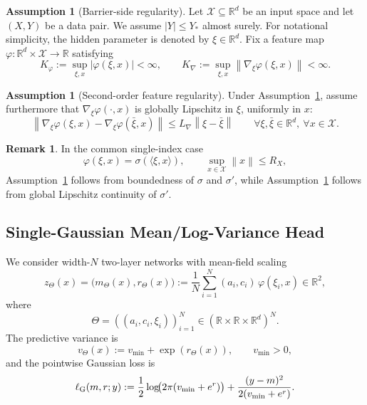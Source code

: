 \documentclass[11pt]{article}
\theoremstyle{definition}
\newtheorem{assumption}[theorem]{Assumption}
\newtheorem{remark}[theorem]{Remark}
\newcommand{\R}{\mathbb{R}}
\newcommand{\norm}[1]{\left\lVert #1 \right\rVert}
\newcommand{\abs}[1]{\left\lvert #1 \right\rvert}
\newcommand{\mc}[1]{\mathcal{#1}}
\begin{document}
\begin{assumption}[Barrier-side regularity]
\label{ass:barrier}
Let $\mc{X}\subseteq\R^d$ be an input space and let $(X,Y)$ be a data pair. We
assume $\abs{Y}\le Y_\ast$ almost surely. For notational simplicity, the hidden
parameter is denoted by $\xi\in\R^d$. Fix a feature map
$\varphi:\R^d\times\mc{X}\to\R$ satisfying
\[
  K_\varphi:=\sup_{\xi,x}\abs{\varphi(\xi,x)}<\infty,
  \qquad
  K_{\nabla}:=\sup_{\xi,x}\norm{\nabla_\xi \varphi(\xi,x)}<\infty.
\]
\end{assumption}

\begin{assumption}[Second-order feature regularity]
\label{ass:feature-second}
Under Assumption~\ref{ass:barrier}, assume furthermore that
$\nabla_\xi\varphi(\cdot,x)$ is globally Lipschitz in $\xi$, uniformly in $x$:
\[
  \norm{\nabla_\xi\varphi(\xi,x)-\nabla_\xi\varphi(\bar\xi,x)}
  \le
  L_{\nabla}\norm{\xi-\bar\xi}
  \qquad
  \forall \xi,\bar\xi\in\R^d,\ \forall x\in\mc{X}.
\]
\end{assumption}

\begin{remark}
In the common single-index case
\[
  \varphi(\xi,x)=\sigma(\langle \xi,x\rangle),
  \qquad
  \sup_{x\in\mc{X}}\norm{x}\le R_X,
\]
Assumption~\ref{ass:barrier} follows from boundedness of $\sigma$ and
$\sigma'$, while Assumption~\ref{ass:feature-second} follows from global
Lipschitz continuity of $\sigma'$.
\end{remark}

\subsection{Single-Gaussian Mean/Log-Variance Head}

We consider width-$N$ two-layer networks with mean-field scaling
\begin{equation}
  z_\Theta(x)
  =
  \bigl(m_\Theta(x),r_\Theta(x)\bigr)
  :=
  \frac1N\sum_{i=1}^N (a_i,c_i)\,\varphi(\xi_i,x)
  \in \R^2,
  \label{eq:gaussian-head}
\end{equation}
where
\[
  \Theta=((a_i,c_i,\xi_i))_{i=1}^N\in(\R\times\R\times\R^d)^N.
\]
The predictive variance is
\begin{equation}
  v_\Theta(x):=v_{\min}+\exp(r_\Theta(x)),
  \qquad
  v_{\min}>0,
  \label{eq:variance-map}
\end{equation}
and the pointwise Gaussian loss is
\begin{equation}
  \ell_{\rm G}(m,r;y)
  :=
  \frac12\log\!\bigl(2\pi(v_{\min}+e^r)\bigr)
  +
  \frac{(y-m)^2}{2(v_{\min}+e^r)}.
  \label{eq:gaussian-loss}
\end{equation}
\end{document}

